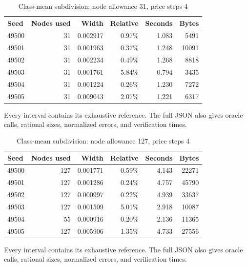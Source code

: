 \begin{table}[p]\centering
\caption{Class-mean subdivision: node allowance 31, price steps 4}\label{tab:group31ec52}
\setlength{\tabcolsep}{4pt}
\begin{tabular}{lrrrrr}
\toprule
Seed & Nodes used & Width & Relative & Seconds & Bytes\\
\midrule
49500 & 31 & 0.002917 & 0.97\% & 1.083 & 5491\\
49501 & 31 & 0.001963 & 0.37\% & 1.248 & 10091\\
49502 & 31 & 0.002234 & 0.49\% & 1.268 & 8818\\
49503 & 31 & 0.001761 & 5.84\% & 0.794 & 3435\\
49504 & 31 & 0.001224 & 0.26\% & 1.230 & 7272\\
49505 & 31 & 0.009043 & 2.07\% & 1.221 & 6317\\
\bottomrule\end{tabular}
\par\vspace{6pt}\begin{minipage}{\textwidth}Every interval contains its exhaustive reference. The full JSON also gives oracle calls, rational sizes, normalized errors, and verification times.\end{minipage}
\end{table}
\begin{table}[p]\centering
\caption{Class-mean subdivision: node allowance 127, price steps 4}\label{tab:group127ec52}
\setlength{\tabcolsep}{4pt}
\begin{tabular}{lrrrrr}
\toprule
Seed & Nodes used & Width & Relative & Seconds & Bytes\\
\midrule
49500 & 127 & 0.001771 & 0.59\% & 4.143 & 22271\\
49501 & 127 & 0.001286 & 0.24\% & 4.757 & 45790\\
49502 & 127 & 0.000997 & 0.22\% & 4.939 & 33637\\
49503 & 127 & 0.001509 & 5.01\% & 2.918 & 10087\\
49504 & 55 & 0.000916 & 0.20\% & 2.136 & 11365\\
49505 & 127 & 0.005906 & 1.35\% & 4.733 & 27556\\
\bottomrule\end{tabular}
\par\vspace{6pt}\begin{minipage}{\textwidth}Every interval contains its exhaustive reference. The full JSON also gives oracle calls, rational sizes, normalized errors, and verification times.\end{minipage}
\end{table}

